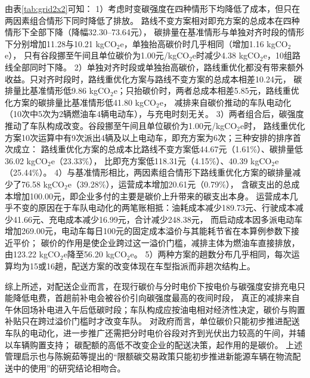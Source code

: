 
由表\ref{tab:grid2x2}可知：
1）考虑时变碳强度在四种情形下均降低了成本，但只在两因素组合情形下同时降低了排放。
路线不变方案相对即充方案的总成本在四种情形下全部下降（降幅32.30--73.64元），
碳排量在基准情形与单独对齐时段的情形下分别增加11.28与10.21 kgCO$_2$e，单独抬高碳价时几乎相同（增加1.16 kgCO$_2$e），
只有谷段挪至午间且单位碳价为1.00元/kgCO$_2$e时减少4.38 kgCO$_2$e，10组路线全部同时下降。
2）单独对齐时段或单独抬高碳价，路线重优化都没有带来额外收益。只对齐时段时，路线重优化方案与路线不变方案的总成本相差10.24元，
碳排量比基准情形低9.86 kgCO$_2$e；只抬碳价时，两者总成本相差5.85元，路线重优化方案的碳排量比基准情形低41.80 kgCO$_2$e，
减排来自碳价推动的车队电动化（10次中5次为2辆燃油车4辆电动车），与充电时刻无关。
3）两者组合后，碳强度推动了车队构成改变。谷段挪至午间且单位碳价为1.00元/kgCO$_2$e时，
路线重优化方案10次运算中有9次派出4辆及以上电动车，即充方案为6次；三种安排的排序首次成立：
路线重优化方案的总成本比路线不变方案低44.67元（1.61\%）、碳排量低36.02 kgCO$_2$e（23.33\%），
比即充方案低118.31元（4.15\%）、40.39 kgCO$_2$e（25.44\%）。
4）与基准情形相比，两因素组合情形下路线重优化方案的碳排量减少了76.58 kgCO$_2$e（39.28\%），运营成本增加20.61元（0.79\%），
含碳支出的总成本增加100.00元，即企业多付的主要是碳价上升带来的碳支出本身。
运营成本几乎不变的原因在于车队电动化的两笔账相抵：油耗成本减少189.73元、行驶成本减少41.66元、充电成本减少16.99元，合计减少248.38元，
而启动成本因多派电动车增加269.00元，电动车每日100元的固定成本溢价与其能耗节省在本算例参数下接近平价；
碳价的作用是使企业跨过这一溢价门槛，减排主体为燃油车直接排放，由123.22 kgCO$_2$e降至56.20 kgCO$_2$e。
5）两种方案的趟数分布几乎相同，每次运算均为15或16趟，配送方案的改变体现在车型指派而非趟次结构上。

综上所述，对配送企业而言，在现行碳价与分时电价下按电价与碳强度安排充电只能降低电费，首趟前补电会被谷价引向碳强度最高的夜间时段，
真正的减排来自午休回场补电进入午后低碳时段；车队构成应按油电相对经济性决定，碳价与购置补贴只在跨过溢价门槛时才改变车队。
对政府而言，单位碳价只能初步推进配送车队的电动化，进一步推广还需把分时电价谷段对齐到光伏出力较高的午间，并辅以车辆购置支持；
碳配额的高低不改变企业的配送决策，起作用的是碳价。
上述管理启示也与陈婉茹等\cite{ref:23}提出的``限额碳交易政策只能初步推进新能源车辆在物流配送中的使用''的研究结论相吻合。

